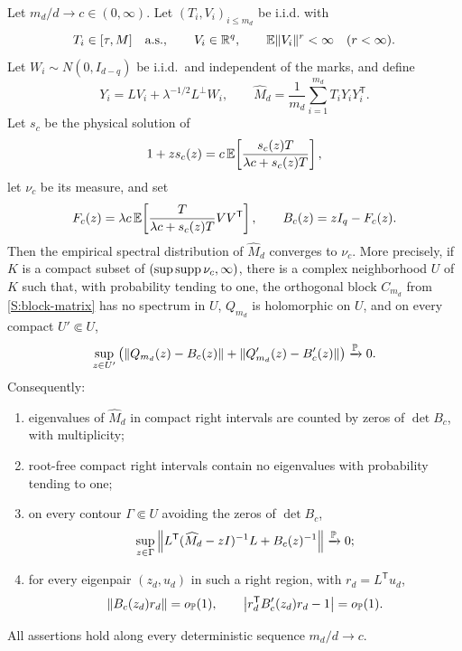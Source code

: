 \begin{proposition}
\label{S:marked-theorem}
Let $m_d/d\to c\in(0,\infty)$. Let $(T_i,V_i)_{i\le m_d}$ be i.i.d. with
\begin{equation}
T_i\in[\tau,M]\quad\text{a.s.},\qquad
V_i\in\mathbb{R}^q,\qquad
\mathbb{E}\|V_i\|^r<\infty\quad(r<\infty).
\label{S:marked-assumptions}
\end{equation}
Let $W_i\sim N(0,I_{d-q})$ be i.i.d.\ and independent of the marks, and define
\begin{equation}
Y_i=LV_i+\lambda^{-1/2}L^\perp W_i,\qquad
\widehat M_d=\frac1{m_d}\sum_{i=1}^{m_d}T_iY_iY_i^{\mathsf T}.
\end{equation}
Let $s_c$ be the physical solution of
\begin{equation}
1+zs_c(z)
=
c\,\mathbb{E}\!\left[
\frac{s_c(z)T}{\lambda c+s_c(z)T}
\right],
\label{S:marked-fixed}
\end{equation}
let $\nu_c$ be its measure, and set
\begin{equation}
F_c(z)
=
\lambda c\,\mathbb{E}\!\left[
\frac{T}{\lambda c+s_c(z)T}VV^{\mathsf T}
\right],
\qquad
B_c(z)=zI_q-F_c(z).
\label{S:marked-F}
\end{equation}
Then the empirical spectral distribution of $\widehat M_d$ converges to
$\nu_c$. More precisely, if $K$ is a compact subset of
$(\sup\operatorname{supp}\nu_c,\infty)$, there is a complex neighborhood $U$ of $K$ such
that, with probability tending to one, the orthogonal block $C_{m_d}$ from
\eqref{S:block-matrix} has no spectrum in $U$, $Q_{m_d}$ is holomorphic on
$U$, and on every compact $U'\Subset U$,
\begin{equation}
\sup_{z\in U'}
\left(
\|Q_{m_d}(z)-B_c(z)\|
+
\|Q_{m_d}'(z)-B_c'(z)\|
\right)
\xrightarrow{\mathbb{P}}0.
\label{S:Q-convergence}
\end{equation}
Consequently:
\begin{enumerate}
\item eigenvalues of $\widehat M_d$ in compact right intervals are counted by
zeros of $\det B_c$, with multiplicity;
\item root-free compact right intervals contain no eigenvalues with
probability tending to one;
\item on every contour $\Gamma\Subset U$ avoiding the zeros of $\det B_c$,
\begin{equation}
\sup_{z\in\Gamma}
\left\|
L^{\mathsf T}(\widehat M_d-zI)^{-1}L+B_c(z)^{-1}
\right\|
\xrightarrow{\mathbb{P}}0;
\label{S:marked-resolvent}
\end{equation}
\item for every eigenpair $(z_d,u_d)$ in such a right region, with
$r_d=L^{\mathsf T}u_d$,
\begin{equation}
\|B_c(z_d)r_d\|=o_{\mathbb{P}}(1),
\qquad
\left|r_d^{\mathsf T}B_c'(z_d)r_d-1\right|=o_{\mathbb{P}}(1).
\label{S:marked-evec}
\end{equation}
\end{enumerate}
All assertions hold along every deterministic sequence $m_d/d\to c$.
\end{proposition}

